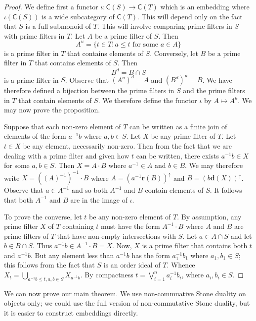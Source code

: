 \documentclass[a4paper]{amsart}
\begin{document}
\begin{proof} We define first a functor $\iota \colon \mathsf{C}(S) \rightarrow \mathsf{C}(T)$
which is an embedding where $\iota (\mathsf{C}(S))$ is a wide subcategory of $\mathsf{C}(T)$.
This will depend only on the fact that $S$ is a full submonoid of $T$.
This will involve comparing prime filters in $S$ with prime filters in $T$.
Let $A$ be a prime filter of $S$.
Then 
$$A^{u} = \{t \in T \colon a \leq t \text{ for some } a \in A\}$$ 
is a prime filter in $T$ that contains elements of $S$.
Conversely, let $B$ be a prime filter in $T$ that contains elements of $S$.
Then 
$$B^{d} = B \cap S$$
is a prime filter in $S$.
Observe that $(A^{u})^{d} = A$ and $(B^{d})^{u} = B$.
We have therefore defined a bijection between the prime filters in $S$ and the prime filters in $T$ that contain elements of $S$.
We therefore define the functor $\iota$ by $A \mapsto A^{u}$.
We may now prove the proposition.

Suppose that each non-zero element of $T$ can be written as a finite join of elements of the form $a^{-1}b$ where $a,b \in S$.
Let $X$ be any prime filter of $T$.
Let $t \in X$ be any element, necessarily non-zero.
Then from the fact that we are dealing with a prime filter and given how $t$ can be written, there exists $a^{-1}b \in X$ for some $a,b \in S$.
Then $X = A \cdot B$ where $a^{-1} \in A$ and $b \in B$.
We may therefore  write $X = ((A)^{-1})^{-1} \cdot B$
where
$A = (a^{-1}\mathbf{r}(B))^{\uparrow}$
and
$B =(b \mathbf{d}(X))^{\uparrow}$.
Observe that $a \in A^{-1}$
and so both $A^{-1}$ and $B$ contain elements of $S$.
It follows that both $A^{-1}$ and $B$ are in the image of $\iota$.

To prove the converse,
let $t$ be any non-zero element of $T$.
By assumption, any prime filter $X$ of $T$ containing $t$ must have the form $A^{-1} \cdot B$ where $A$ and $B$ are 
prime filters of $T$ that have non-empty intersections with $S$.
Let $a \in A \cap S$ and let $b \in B \cap S$.
Thus $a^{-1}b \in A^{-1}  \cdot B = X$.
Now,  $X$ is a prime filter that contains both $t$ and $a^{-1}b$.
But any element less than $a^{-1}b$ has the form $a_{1}^{-1}b_{1}$ where $a_{1}, b_{1} \in S$;
this follows from the fact that $S$ is an order ideal of $T$.
Whence $X_{t} = \bigcup_{a^{-1}b \leq t, a,b \in S} X_{a^{-1}b}$.
By compactness $t = \bigvee_{i=1}^{n}a_{i}^{-1}b_{i}$, where $a_{i},b_{i} \in S$.
\end{proof}


We can now prove our main theorem.
We use non-commuative Stone duality on objects only;
we could use the full version of non-commutative Stone duality, but it is easier to construct embeddings directly.
\end{document}
